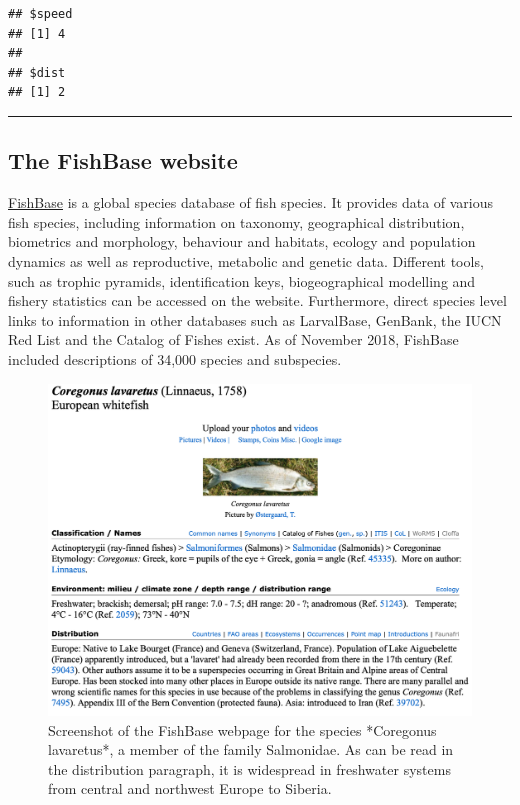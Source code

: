 \documentclass[
]{book}
\newenvironment{Shaded}{\begin{snugshade}}{\end{snugshade}}
\newcommand{\KeywordTok}[1]{\textcolor[rgb]{0.13,0.29,0.53}{\textbf{#1}}}
\newcommand{\NormalTok}[1]{#1}
\newcommand{\OperatorTok}[1]{\textcolor[rgb]{0.81,0.36,0.00}{\textbf{#1}}}
\newcommand{\StringTok}[1]{\textcolor[rgb]{0.31,0.60,0.02}{#1}}
\begin{document}
\begin{Shaded}
\end{Shaded}

\begin{verbatim}
## $speed
## [1] 4
## 
## $dist
## [1] 2
\end{verbatim}

\begin{center}\rule{0.5\linewidth}{0.5pt}\end{center}

\hypertarget{the-fishbase-website}{%
\subsection{The FishBase website}\label{the-fishbase-website}}

\href{https://www.fishbase.in/search.php}{FishBase} is a global species database of fish species. It provides data of various fish species, including information on taxonomy, geographical distribution, biometrics and morphology, behaviour and habitats, ecology and population dynamics as well as reproductive, metabolic and genetic data. Different tools, such as trophic pyramids, identification keys, biogeographical modelling and fishery statistics can be accessed on the website. Furthermore, direct species level links to information in other databases such as LarvalBase, GenBank, the IUCN Red List and the Catalog of Fishes exist. As of November 2018, FishBase included descriptions of 34,000 species and subspecies.

\begin{figure}
\includegraphics[width=21.67in]{./figures/screen} \caption{Screenshot of the FishBase webpage for the species *Coregonus lavaretus*, a member of the family Salmonidae. As can be read in the distribution paragraph, it is widespread in freshwater systems from central and northwest Europe to Siberia.}\label{fig:screen}
\end{figure}
\end{document}
